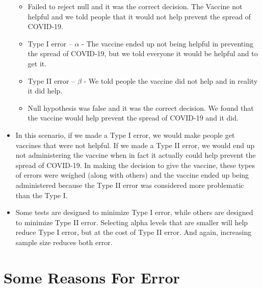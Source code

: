 \documentclass[
  letterpaper,
  DIV=11,
  numbers=noendperiod]{scrreprt}
\providecommand{\tightlist}{%
  \setlength{\itemsep}{0pt}\setlength{\parskip}{0pt}}\usepackage{longtable,booktabs,array}
\begin{document}
\begin{itemize}
  \begin{itemize}
  \tightlist
  \item
    Failed to reject null and it was the correct decision. The Vaccine
    not helpful and we told people that it would not help prevent the
    spread of COVID-19.
  \item
    Type I error -- \(\alpha\) - The vaccine ended up not being helpful
    in preventing the spread of COVID-19, but we told everyone it would
    be helpful and to get it.
  \item
    Type II error -- \(\beta\) - We told people the vaccine did not help
    and in reality it did help.
  \item
    Null hypothesis was false and it was the correct decision. We found
    that the vaccine would help prevent the spread of COVID-19 and it
    did.
  \end{itemize}
\item
  In this scenario, if we made a Type I error, we would make people get
  vaccines that were not helpful. If we made a Type II error, we would
  end up not administering the vaccine when in fact it actually could
  help prevent the spread of COVID-19. In making the decision to give
  the vaccine, these types of errors were weighed (along with others)
  and the vaccine ended up being administered because the Type II error
  was considered more problematic than the Type I.
\item
  Some tests are designed to minimize Type I error, while others are
  designed to minimize Type II error. Selecting alpha levels that are
  smaller will help reduce Type I error, but at the cost of Type II
  error. And again, increasing sample size reduces both error.
\end{itemize}

\section{Some Reasons For Error}\label{some-reasons-for-error}
\end{document}

